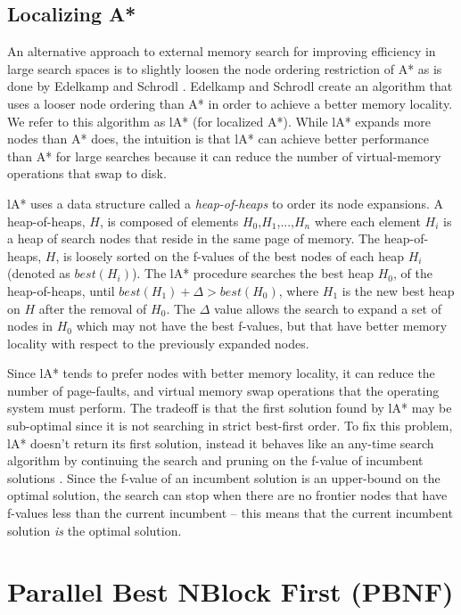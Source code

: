 \documentclass{article}
\begin{document}
\subsection{Localizing A*}

An alternative approach to external memory search for improving
efficiency in large search spaces is to slightly loosen the node
ordering restriction of A* as is done by Edelkamp and Schrodl
\cite{edelkamp:loc}.  Edelkamp and Schrodl create an algorithm that
uses a looser node ordering than A* in order to achieve a better
memory locality. We refer to this algorithm as lA* (for localized A*).
While lA* expands more nodes than A* does, the intuition is that lA*
can achieve better performance than A* for large searches because it
can reduce the number of virtual-memory operations that swap to disk.

lA* uses a data structure called a \emph{heap-of-heaps} to order its
node expansions.  A heap-of-heaps, $H$, is composed of elements
$H_0$,$H_1$,...,$H_n$ where each element $H_i$ is a heap of search
nodes that reside in the same page of memory.  The heap-of-heaps, $H$,
is loosely sorted on the f-values of the best nodes of each heap
$H_i$ (denoted as $best(H_i)$).  The lA* procedure searches the best
heap $H_0$, of the heap-of-heaps, until $best(H_1) + \Delta >
best(H_0)$, where $H_1$ is the new best heap on $H$ after the removal
of $H_0$.  The $\Delta$ value allows the search to expand a set of
nodes in $H_0$ which may not have the best f-values, but that have
better memory locality with respect to the previously expanded nodes.

Since lA* tends to prefer nodes with better memory locality, it can
reduce the number of page-faults, and virtual memory swap operations
that the operating system must perform.  The tradeoff is that the
first solution found by lA* may be sub-optimal since it is not
searching in strict best-first order.  To fix this problem, lA*
doesn't return its first solution, instead it behaves like an any-time
search algorithm by continuing the search and pruning on the f-value
of incumbent solutions \cite{hansen:ahs}.  Since the f-value of an
incumbent solution is an upper-bound on the optimal solution, the
search can stop when there are no frontier nodes that have f-values
less than the current incumbent -- this means that the current
incumbent solution \emph{is} the optimal solution.

\section{Parallel Best NBlock First (PBNF)}
\end{document}
